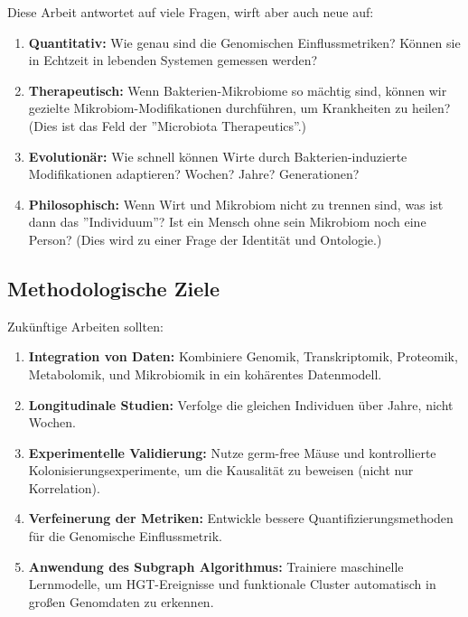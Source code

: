 \documentclass[a4paper,12pt]{article}
\theoremstyle{definition}
\begin{document}
Diese Arbeit antwortet auf viele Fragen, wirft aber auch neue auf:

\begin{enumerate}
    \item \textbf{Quantitativ:} Wie genau sind die Genomischen Einflussmetriken? Können sie in Echtzeit in lebenden Systemen gemessen werden?
    
    \item \textbf{Therapeutisch:} Wenn Bakterien-Mikrobiome so mächtig sind, können wir gezielte Mikrobiom-Modifikationen durchführen, um Krankheiten zu heilen? (Dies ist das Feld der ''Microbiota Therapeutics''.)
    
    \item \textbf{Evolutionär:} Wie schnell können Wirte durch Bakterien-induzierte Modifikationen adaptieren? Wochen? Jahre? Generationen?
    
    \item \textbf{Philosophisch:} Wenn Wirt und Mikrobiom nicht zu trennen sind, was ist dann das ''Individuum''? Ist ein Mensch ohne sein Mikrobiom noch eine Person? (Dies wird zu einer Frage der Identität und Ontologie.)
\end{enumerate}

\subsection{Methodologische Ziele}

Zukünftige Arbeiten sollten:

\begin{enumerate}
    \item \textbf{Integration von Daten:} Kombiniere Genomik, Transkriptomik, Proteomik, Metabolomik, und Mikrobiomik in ein kohärentes Datenmodell.
    
    \item \textbf{Longitudinale Studien:} Verfolge die gleichen Individuen über Jahre, nicht Wochen.
    
    \item \textbf{Experimentelle Validierung:} Nutze germ-free Mäuse und kontrollierte Kolonisierungsexperimente, um die Kausalität zu beweisen (nicht nur Korrelation).
    
    \item \textbf{Verfeinerung der Metriken:} Entwickle bessere Quantifizierungsmethoden für die Genomische Einflussmetrik.
    
    \item \textbf{Anwendung des Subgraph Algorithmus:} Trainiere maschinelle Lernmodelle, um HGT-Ereignisse und funktionale Cluster automatisch in großen Genomdaten zu erkennen.
\end{enumerate}
\end{document}

